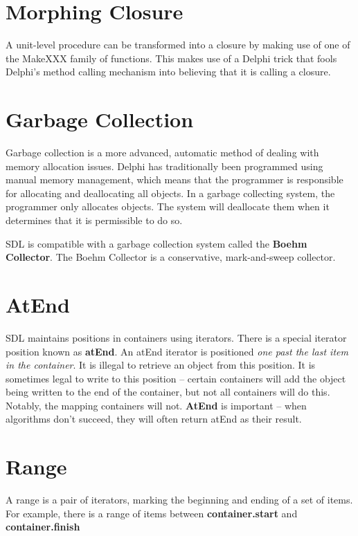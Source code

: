 \documentclass{report}
\begin{document}
\section{Morphing Closure}

A unit-level procedure can be transformed into a closure 
by making use of one of the
MakeXXX family of functions. This makes use of a Delphi 
trick that fools Delphi's method
calling mechanism into believing that it is calling a closure.

\section{Garbage Collection}

Garbage collection is a more advanced, automatic method of dealing with
memory allocation issues. Delphi has traditionally been programmed using
manual memory management, which means that the programmer is responsible for
allocating and deallocating all objects. In a garbage collecting system, the
programmer only allocates objects. The system will deallocate them when it
determines that it is permissible to do so.

SDL is compatible with a garbage collection system called the \textbf{Boehm
Collector}. The Boehm Collector is a conservative, mark-and-sweep collector.

\section{AtEnd}

SDL maintains positions in containers using iterators.  There is a special
iterator position known as \textbf{atEnd}. An atEnd iterator is positioned
\emph{one past the last item in the container}. It
is illegal to retrieve an object from this position. It is sometimes legal
to write to this position -- certain containers will add the object being
written to the end of the container, but not all containers will do this.
Notably, the mapping containers will not. \textbf{AtEnd} is important -- when
algorithms don't succeed, they will often return atEnd as their result.

\section{Range}

A range is a pair of iterators, marking the beginning and ending of a set of
items. For example, there is a range of items between
\textbf{container.start} and \textbf{container.finish}
\end{document}
